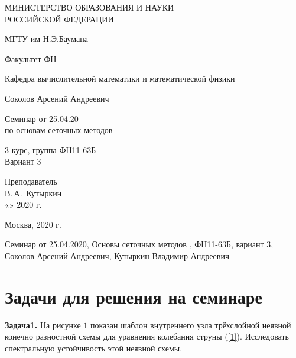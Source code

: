 \documentclass[14pt,a4paper]{scrartcl}
\begin{document}
	\begin{titlepage}
	\begin{center}
		\large
		МИНИСТЕРСТВО ОБРАЗОВАНИЯ И НАУКИ\\ РОССИЙСКОЙ ФЕДЕРАЦИИ
		
		\vspace{0.5cm}
		
		МГТУ им Н.Э.Баумана
		\vspace{0.25cm}
		
		Факультет ФН
		
		Кафедра вычислительной математики и математической физики
		\vfill
		
		
		Соколов Арсений Андреевич\\
		\vfill
		
		
		{\LARGE Семинар от 25.04.20\\ по основам сеточных методов \\[2mm]
		}
		\bigskip
		
		3 курс, группа ФН11-63Б\\
		Вариант 3
	\end{center}
	\vfill
	
	\newlength{\ML}
	\hfill\begin{minipage}{0.4\textwidth}
		Преподаватель\\
		\underline{\hspace{3cm}} В.\,А.~Кутыркин\\
		«\underline{\hspace{0.7cm}}» \underline{\hspace{1.71cm}} 2020 г.
	\end{minipage}%
	\bigskip
	
	
	\vfill
	
	\begin{center}
		Москва, 2020 г.
	\end{center}
\end{titlepage}
Семинар от 25.04.2020, Основы сеточных методов , ФН11-63Б, вариант 3,
Соколов Арсений Андреевич, Кутыркин Владимир Андреевич

\section*{Задачи для решения на семинаре}

\textbf{Задача1.} На рисунке $1$ показан шаблон внутреннего узла трёхслойной неявной конечно разностной схемы для уравнения колебания струны (\ref{1}). Исследовать спектральную устойчивость этой неявной схемы.
 
\end{document}
